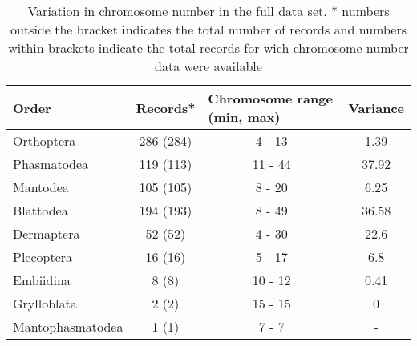 \begin{table}
\begin{tabular}{lccc}
\hline
Order            & \multicolumn{1}{l}{Records*} & \multicolumn{1}{l}{Chromosome range (min, max)} & \multicolumn{1}{l}{Variance} \\ \hline
Orthoptera       & 286 (284)                    & 4 - 13                                          & 1.39                         \\
Phasmatodea      & 119 (113)                    & 11 - 44                                         & 37.92                        \\
Mantodea         & 105 (105)                    & 8 - 20                                          & 6.25                         \\
Blattodea        & 194 (193)                    & 8 - 49                                          & 36.58                        \\
Dermaptera       & 52 (52)                      & 4 - 30                                          & 22.6                         \\
Plecoptera       & 16 (16)                      & 5 - 17                                          & 6.8                          \\
Embiidina        & 8 (8)                        & 10 - 12                                         & 0.41                         \\
Grylloblata      & 2 (2)                        & 15 - 15                                         & 0                            \\
Mantophasmatodea & 1 (1)                        & 7 - 7                                           & -                            \\ \hline
\end{tabular}
\caption{Variation in chromosome number in the full data set. * numbers outside the bracket indicates the total number of records and numbers within brackets indicate the total records for wich chromosome number data were available}
\label{tab:chrom.var}
\end{table}